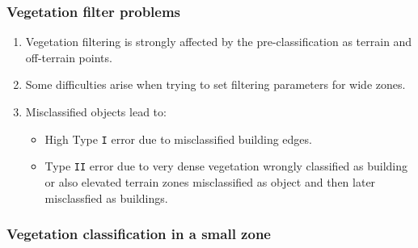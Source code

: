 \begin{frame}
  \frametitle{Vegetation filter problems}
    \begin{enumerate}
	\item Vegetation filtering is strongly affected by the pre-classification as terrain and off-terrain points.
	\item Some difficulties arise when trying to set filtering parameters for wide zones.
	\item Misclassified objects lead to:
	    \begin{itemize}
		\item High Type \texttt{I} error due to misclassified building edges.
		\item Type \texttt{II} error due to very dense vegetation wrongly classified as building or also elevated terrain zones misclassified as object and then later misclassfied as buildings.
	    \end{itemize}
    \end{enumerate}
\end{frame}
\begin{frame}
  \frametitle{Vegetation classification in a small zone}
    \begin{center}
    \end{center}
\end{frame}
